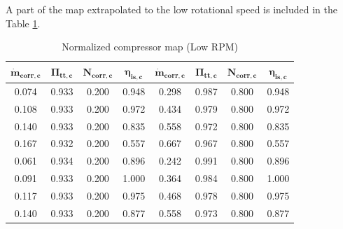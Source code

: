 A part of the map extrapolated to the low rotational speed is included in the Table \ref{tab:C7_compmap_LRPM}. 
\begin{longtable}[c]{@{}cccc|cccc@{}}
\caption{Normalized compressor map (Low RPM)}
\label{tab:C7_compmap_LRPM}\\
\toprule
$\mathbf{\dot{m}_{corr,c}}$ & $\mathbf{\Pi_{tt,c}}$ & $\mathbf{N_{corr,c}}$ & $\mathbf{\eta_{is,c}}$ & $\mathbf{\dot{m}_{corr,c}}$ & $\mathbf{\Pi_{tt,c}}$ & $\mathbf{N_{corr,c}}$ & $\mathbf{\eta_{is,c}}$ \\* \midrule
\endfirsthead
%
\endhead
%
\bottomrule
\endfoot
%
\endlastfoot
%
0.074                            & 0.933                      & 0.200                 & 0.948                       & 0.298                            & 0.987                      & 0.800                 & 0.948                       \\
0.108                            & 0.933                      & 0.200                 & 0.972                       & 0.434                            & 0.979                      & 0.800                 & 0.972                       \\
0.140                            & 0.933                      & 0.200                 & 0.835                       & 0.558                            & 0.972                      & 0.800                 & 0.835                       \\
0.167                            & 0.932                      & 0.200                 & 0.557                       & 0.667                            & 0.967                      & 0.800                 & 0.557                       \\
0.061                            & 0.934                      & 0.200                 & 0.896                       & 0.242                            & 0.991                      & 0.800                 & 0.896                       \\
0.091                            & 0.933                      & 0.200                 & 1.000                       & 0.364                            & 0.984                      & 0.800                 & 1.000                       \\
0.117                            & 0.933                      & 0.200                 & 0.975                       & 0.468                            & 0.978                      & 0.800                 & 0.975                       \\
0.140                            & 0.933                      & 0.200                 & 0.877                       & 0.558                            & 0.973                      & 0.800                 & 0.877                       \\

\end{longtable}
